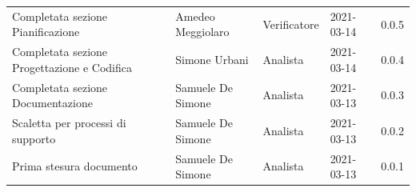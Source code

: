 \documentclass[a4paper]{article}
\begin{document}
\begin{center}
\begin{longtable}[!h]{p{160px} p{80px} p{70px} p{55px} p{40px}}
        Completata sezione Pianificazione                                          & Amedeo Meggiolaro                           & Verificatore   & 2021-03-14    & 0.0.5             \\
        Completata sezione Progettazione e Codifica                                & Simone Urbani                               & Analista       & 2021-03-14    & 0.0.4             \\
        Completata sezione Documentazione                                          & Samuele De Simone                           & Analista       & 2021-03-13    & 0.0.3             \\
        Scaletta per processi di supporto                                          & Samuele De Simone                           & Analista       & 2021-03-13    & 0.0.2             \\
        Prima stesura documento                                                    & Samuele De Simone                           & Analista       & 2021-03-13    & 0.0.1             \\
    \end{longtable}
\end{center}

\newpage
\tableofcontents
\newpage





\end{document}

